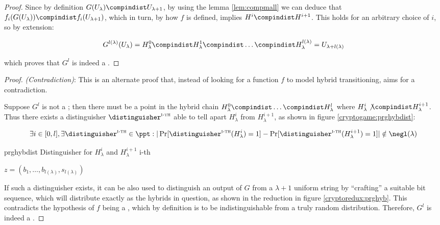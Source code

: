 \begin{proof}
    Since by \prg{} definition $G(U_\lambda) \compindist U_{\lambda + 1}$, by using the lemma \ref{lem:compmall} we can deduce that $f_i(G(U_\lambda)) \compindist f_{i}(U_{\lambda + 1})$, which in turn, by how $f$ is defined, implies $H^{i} \compindist H^{i + 1}$. This holds for an arbitrary choice of $i$, so by extension:

    \begin{equation*}
        G^{l(\lambda)}(U_\lambda) = H_{\lambda}^{0} \compindist H_{\lambda}^{1} \compindist \dots \compindist H_{\lambda}^{{l(\lambda)}} = U_{\lambda + l(\lambda)}
    \end{equation*}

    which proves that $G^l$ is indeed a \prg.
\end{proof}

\begin{proof}
    \textit{(Contradiction)}: This is an alternate proof that, instead of looking for a function $f$ to model hybrid transitioning, aims for a contradiction.
    
    Suppose $G^l$ is not a \prg; then there must be a point in the hybrid chain $H_\lambda^0 \compindist \dots \compindist H_\lambda^l$ where $H_\lambda^i \not\compindist H_\lambda^{i + 1}$. Thus there exists a distinguisher $\distinguisher^{\textsc{i-th}}$ able to tell apart $H_\lambda^i$ from $H_\lambda^{i + 1}$, as shown in figure \ref{cryptogame:prghybdist}:

    \[
        \exists i \in [0, l], \exists \distinguisher^{\textsc{i-th}} \in \ppt : |\Pr[\distinguisher^{\textsc{i-th}}(H_\lambda^i) = 1] - \Pr[\distinguisher^{\textsc{i-th}}(H_\lambda^{i + 1}) = 1]| \notin \negl(\lambda)
    \]

    \begin{cryptogame}
        {prghybdist}
        {Distinguisher for $H_{\lambda}^{i}$ and $H_{\lambda}^{i+1}$}
        {i-th}

        {$z = (b_{1}, \dots ,b_{l(\lambda)}, s_{l(\lambda)})$}{}

        \cseqdelay
        

    \end{cryptogame}

    If such a distinguisher exists, it can be also used to distinguish an output of $G$ from a $\lambda+1$ uniform string by ``crafting'' a suitable bit sequence, which will distribute exactly as the hybrids in question, as shown in the reduction in figure \ref{cryptoredux:prghyb}. This contradicts the hypothesis of $f$ being a \prg, which by definition is to be indistinguishable from a truly random distribution. Therefore, $G^l$ is indeed a \prg.


\end{proof}
